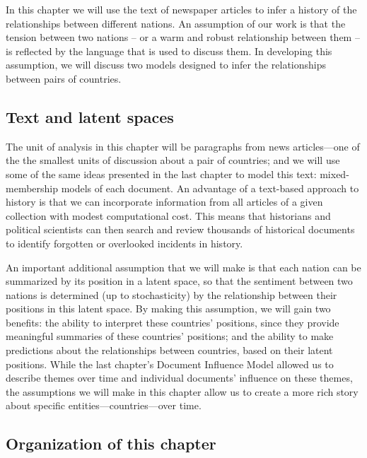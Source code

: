 In this chapter we will use the text of newspaper articles to infer a
history of the relationships between different nations.  An assumption
of our work is that the tension between two nations -- or a warm and
robust relationship between them -- is reflected by the language that
is used to discuss them.  In developing this assumption, we will
discuss two models designed to infer the relationships between pairs
of countries.

\subsection*{Text and latent spaces}
The unit of analysis in this chapter will be paragraphs from news
articles---one of the the smallest units of discussion about a pair of
countries; and we will use some of the same ideas presented in the
last chapter to model this text: mixed-membership models of each
document.  An advantage of a text-based approach to history is that we
can incorporate information from all articles of a given collection
with modest computational cost.  This means that historians and
political scientists can then search and review thousands of
historical documents to identify forgotten or overlooked incidents in
history.

An important additional assumption that we will make is that each
nation can be summarized by its position in a latent space, so that
the sentiment between two nations is determined (up to stochasticity)
by the relationship between their positions in this latent space.  By
making this assumption, we will gain two benefits: the ability to
interpret these countries' positions, since they provide meaningful
summaries of these countries' positions; and the ability to make
predictions about the relationships between countries, based on their
latent positions. While the last chapter's Document Influence Model
allowed us to describe themes over time and individual documents'
influence on these themes, the assumptions we will make in this
chapter allow us to create a more rich story about specific
entities---countries---over time.



\subsection*{Organization of this chapter}


